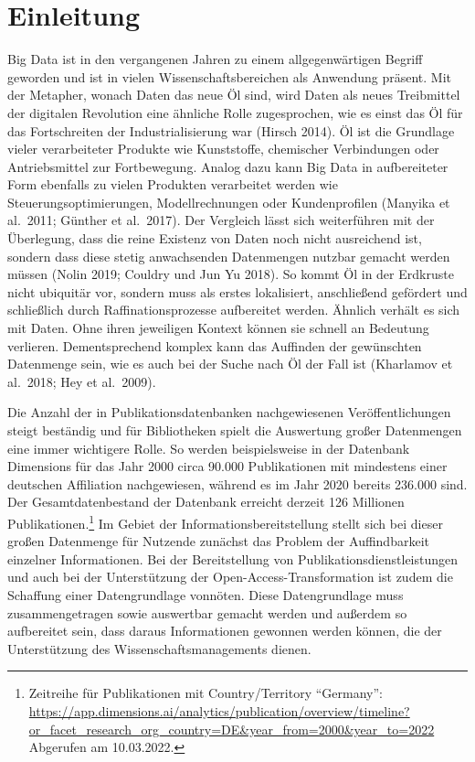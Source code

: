 \documentclass[a4paper,
fontsize=11pt,
oneside,
numbers=noperiodatend,
parskip=half-,
bibliography=totoc,
final
]{scrartcl}
\begin{document}
\hypertarget{einleitung}{%
\section{Einleitung}\label{einleitung}}

Big Data ist in den vergangenen Jahren zu einem allgegenwärtigen Begriff
geworden und ist in vielen Wissenschaftsbereichen als Anwendung präsent.
Mit der Metapher, wonach Daten das neue Öl sind, wird Daten als neues
Treibmittel der digitalen Revolution eine ähnliche Rolle zugesprochen,
wie es einst das Öl für das Fortschreiten der Industrialisierung war
(Hirsch 2014). Öl ist die Grundlage vieler verarbeiteter Produkte wie
Kunststoffe, chemischer Verbindungen oder Antriebsmittel zur
Fortbewegung. Analog dazu kann Big Data in aufbereiteter Form ebenfalls
zu vielen Produkten verarbeitet werden wie Steuerungsoptimierungen,
Modellrechnungen oder Kundenprofilen (Manyika et al.~2011; Günther et
al.~2017). Der Vergleich lässt sich weiterführen mit der Überlegung,
dass die reine Existenz von Daten noch nicht ausreichend ist, sondern
dass diese stetig anwachsenden Datenmengen nutzbar gemacht werden müssen
(Nolin 2019; Couldry und Jun Yu 2018). So kommt Öl in der Erdkruste
nicht ubiquitär vor, sondern muss als erstes lokalisiert, anschließend
gefördert und schließlich durch Raffinationsprozesse aufbereitet werden.
Ähnlich verhält es sich mit Daten. Ohne ihren jeweiligen Kontext können
sie schnell an Bedeutung verlieren. Dementsprechend komplex kann das
Auffinden der gewünschten Datenmenge sein, wie es auch bei der Suche
nach Öl der Fall ist (Kharlamov et al.~2018; Hey et al.~2009).

Die Anzahl der in Publikationsdatenbanken nachgewiesenen
Veröffentlichungen steigt beständig und für Bibliotheken spielt die
Auswertung großer Datenmengen eine immer wichtigere Rolle. So werden
beispielsweise in der Datenbank Dimensions für das Jahr 2000 circa
90.000 Publikationen mit mindestens einer deutschen Affiliation
nachgewiesen, während es im Jahr 2020 bereits 236.000 sind. Der
Gesamtdatenbestand der Datenbank erreicht derzeit 126 Millionen
Publikationen.\footnote{Zeitreihe für Publikationen mit
  Country/Territory \enquote{Germany}:
  \url{https://app.dimensions.ai/analytics/publication/overview/timeline?or_facet_research_org_country=DE\&year_from=2000\&year_to=2022}
  Abgerufen am 10.03.2022.} Im Gebiet der Informationsbereitstellung
stellt sich bei dieser großen Datenmenge für Nutzende zunächst das
Problem der Auffindbarkeit einzelner Informationen. Bei der
Bereitstellung von Publikationsdienstleistungen und auch bei der
Unterstützung der Open-Access-Transformation ist zudem die Schaffung
einer Datengrundlage vonnöten. Diese Datengrundlage muss
zusammengetragen sowie auswertbar gemacht werden und außerdem so
aufbereitet sein, dass daraus Informationen gewonnen werden können, die
der Unterstützung des Wissenschaftsmanagements dienen.
\end{document}
